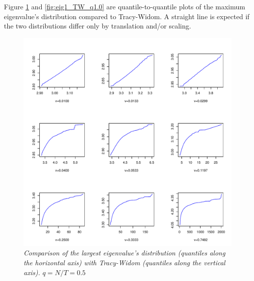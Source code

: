 \documentclass{article}
\begin{document}
Figure \ref{fig:eig1_TW_q0.5} and \ref{fig:eig1_TW_q1.0} are
quantile-to-quantile plots of the maximum eigenvalue's distribution
compared to Tracy-Widom. A straight line is expected if the two
distributions differ only by translation and/or scaling.
\begin{figure}[htb!]
  \centering
  \includegraphics[scale=0.5]{../r/eigmax_TW_q0dot5.pdf}
  \caption{\small \it Comparison of the largest eigenvalue's
    distribution (quantiles along the horizontal axis) with
    Tracy-Widom (quantiles along the vertical axis). $q=N/T=0.5$}
  \label{fig:eig1_TW_q0.5}
\end{figure}
\end{document}
